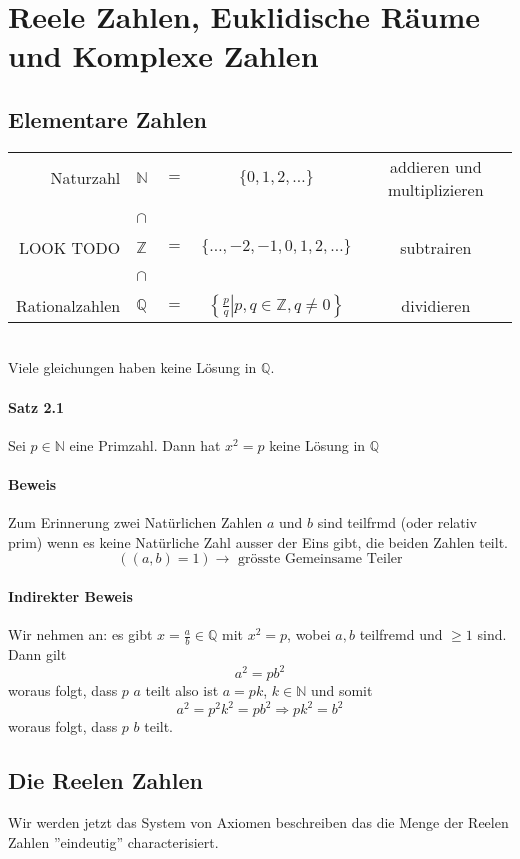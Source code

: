 \chapter{Reele Zahlen, Euklidische Räume und Komplexe Zahlen}
\section{Elementare Zahlen}
\begin{tabular}{r l c c c}
Naturzahl & $\mathbb{N}$&$=$& $\{0,1,2,\dots\}$& addieren und multiplizieren\\
~& $\cap$ &~&~&~\\
LOOK TODO & $\mathbb{Z}$&$=$& $\{\dots ,-2,-1,0,1,2,\dots\}$& subtrairen\\
~& $\cap$ &~&~&~\\
Rationalzahlen & $\mathbb{Q}$&$=$& $\left\{ {\left. {\frac{p}{q}} \right|p,q \in \mathbb{Z},q\not  = 0} \right\}$& dividieren\\
\end{tabular}
\\
Viele gleichungen haben keine Lösung in $\mathbb{Q}$.
\subsubsection*{Satz 2.1}
Sei $p\in\mathbb{N}$ eine Primzahl. Dann hat $x^2=p$ keine Lösung in $\mathbb{Q}$
\subsubsection*{Beweis}
Zum Erinnerung zwei Natürlichen Zahlen $a$ und $b$ sind teilfrmd (oder relativ prim) wenn es keine Natürliche Zahl ausser der Eins gibt, die beiden Zahlen teilt. $$\left( (a,b)=1\right)\rightarrow\text{ grösste Gemeinsame Teiler}$$

\subsubsection*{Indirekter Beweis}
Wir nehmen an: es gibt $x=\frac{a}{b}\in \mathbb{Q}$ mit $x^2 =p$, wobei $a,b$ teilfremd und $\geq 1$ sind. Dann gilt $$a^2=pb^2$$ woraus folgt, dass $p$ $a$ teilt also ist $a=pk$, $k\in\mathbb{N}$ und somit $$a^2=p^2k^2=pb^2\Rightarrow pk^2=b^2$$ woraus folgt, dass $p$ $b$ teilt.

\section{Die Reelen Zahlen}
Wir werden jetzt das System von Axiomen beschreiben das die Menge der Reelen Zahlen ''eindeutig'' characterisiert. \\

